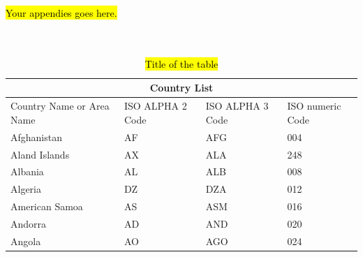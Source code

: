 \hl{Your appendies goes here.}
~\\
~\\
~\\

\begin{table}
	\begin{tabular}{ |p{3cm}||p{3cm}|p{3cm}|p{3cm}|  }
		\hline
		\multicolumn{4}{|c|}{Country List} \\
		\hline
		Country Name     or Area Name& ISO ALPHA 2 Code &ISO ALPHA 3 Code&ISO numeric Code\\
		\hline
		Afghanistan   & AF    &AFG&   004\\
		Aland Islands&   AX  & ALA   &248\\
		Albania &AL & ALB&  008\\
		Algeria    &DZ & DZA&  012\\
		American Samoa&   AS  & ASM&016\\
		Andorra& AD  & AND   &020\\
		Angola& AO  & AGO&024\\
		\hline
	\end{tabular}
	\caption{\hl{Title of the table}}
\end{table}



